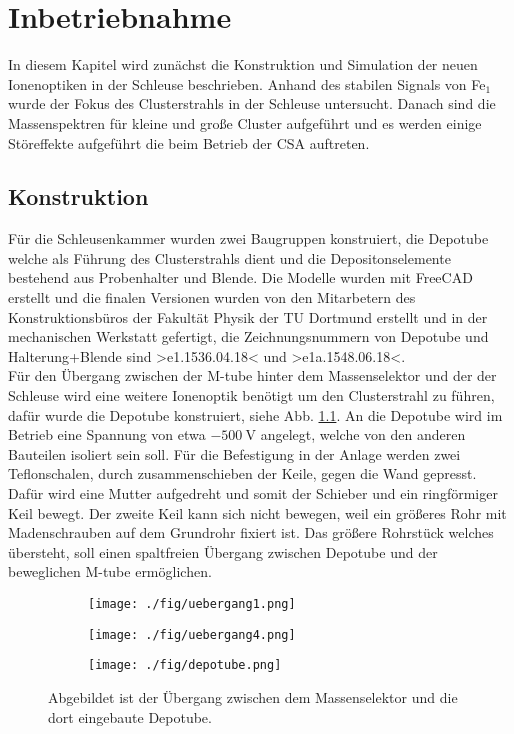 \chapter{Inbetriebnahme}
In diesem Kapitel wird zunächst die Konstruktion und Simulation der neuen Ionenoptiken in der Schleuse beschrieben.
Anhand des stabilen Signals von Fe$_1$ wurde der Fokus des Clusterstrahls in der Schleuse untersucht.
Danach sind die Massenspektren für kleine und große Cluster aufgeführt und es werden einige Störeffekte aufgeführt die beim Betrieb der CSA auftreten.
\section{Konstruktion}
Für die Schleusenkammer wurden zwei Baugruppen konstruiert, die Depotube welche als Führung des Clusterstrahls dient und die Depositonselemente bestehend aus Probenhalter und Blende. Die Modelle wurden mit FreeCAD\cite{freecad} erstellt und die finalen Versionen wurden von den Mitarbetern des Konstruktionsbüros der Fakultät Physik der TU Dortmund erstellt \cite{konstruktion} und in der mechanischen Werkstatt gefertigt, die Zeichnungsnummern von Depotube und Halterung+Blende sind >e1.1536.04.18< und >e1a.1548.06.18<.\\

Für den Übergang zwischen der M-tube hinter dem Massenselektor und der der Schleuse wird eine weitere Ionenoptik benötigt um den Clusterstrahl zu führen, dafür wurde die Depotube konstruiert, siehe Abb. \ref{fig:depotube}.
An die Depotube wird im Betrieb eine Spannung von etwa $\SI{-500}{\volt}$ angelegt, welche von den anderen Bauteilen isoliert sein soll.
Für die Befestigung in der Anlage werden zwei Teflonschalen, durch zusammenschieben der Keile, gegen die Wand gepresst.
Dafür wird eine Mutter aufgedreht und somit der Schieber und ein ringförmiger Keil bewegt.
Der zweite Keil kann sich nicht bewegen, weil ein größeres Rohr mit Madenschrauben auf dem Grundrohr fixiert ist.
Das größere Rohrstück welches übersteht, soll einen spaltfreien Übergang zwischen Depotube und der beweglichen M-tube ermöglichen.

\begin{figure}
  \begin{subfigure}[h]{1\textwidth}
    \texttt{[image: ./fig/uebergang1.png]}
  \end{subfigure}\hfill
  \begin{subfigure}[h]{1\textwidth}
    \texttt{[image: ./fig/uebergang4.png]}
  \end{subfigure}\hfill
  \begin{subfigure}[h]{1\textwidth}
    \texttt{[image: ./fig/depotube.png]}
  \end{subfigure}
  \caption{Abgebildet ist der Übergang zwischen dem Massenselektor und die dort eingebaute Depotube.}
  \label{fig:depotube}
\end{figure}

